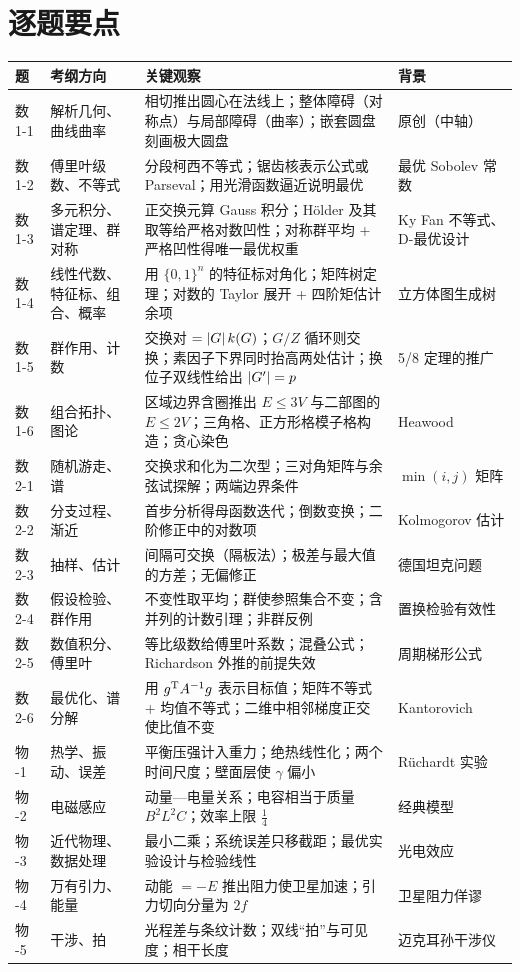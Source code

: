 \documentclass[cjk=noto, nomargin]{mojing-notes}
\begin{document}
\section{逐题要点}

{\small
\begin{longtable}{p{1.5cm}p{3.2cm}p{5.9cm}p{2.5cm}}
\toprule
题 & 考纲方向 & 关键观察 & 背景 \\
\midrule
\endhead
数 1-1 & 解析几何、曲线曲率 & 相切推出圆心在法线上；整体障碍（对称点）与局部障碍（曲率）；嵌套圆盘刻画极大圆盘 & 原创（中轴） \\
数 1-2 & 傅里叶级数、不等式 & 分段柯西不等式；锯齿核表示公式或 Parseval；用光滑函数逼近说明最优 & 最优 Sobolev 常数 \\
数 1-3 & 多元积分、谱定理、群对称 & 正交换元算 Gauss 积分；Hölder 及其取等给严格对数凹性；对称群平均 + 严格凹性得唯一最优权重 & Ky Fan 不等式、D-最优设计 \\
数 1-4 & 线性代数、特征标、组合、概率 & 用 $\{0,1\}^n$ 的特征标对角化；矩阵树定理；对数的 Taylor 展开 + 四阶矩估计余项 & 立方体图生成树 \\
数 1-5 & 群作用、计数 & 交换对 $=\lvert G\rvert\,k(G)$；$G/Z$ 循环则交换；素因子下界同时抬高两处估计；换位子双线性给出 $\lvert G'\rvert=p$ & 5/8 定理的推广 \\
数 1-6 & 组合拓扑、图论 & 区域边界含圈推出 $E\le3V$ 与二部图的 $E\le2V$；三角格、正方形格模子格构造；贪心染色 & Heawood \\
数 2-1 & 随机游走、谱 & 交换求和化为二次型；三对角矩阵与余弦试探解；两端边界条件 & $\min(i,j)$ 矩阵 \\
数 2-2 & 分支过程、渐近 & 首步分析得母函数迭代；倒数变换；二阶修正中的对数项 & Kolmogorov 估计 \\
数 2-3 & 抽样、估计 & 间隔可交换（隔板法）；极差与最大值的方差；无偏修正 & 德国坦克问题 \\
数 2-4 & 假设检验、群作用 & 不变性取平均；群使参照集合不变；含并列的计数引理；非群反例 & 置换检验有效性 \\
数 2-5 & 数值积分、傅里叶 & 等比级数给傅里叶系数；混叠公式；Richardson 外推的前提失效 & 周期梯形公式 \\
数 2-6 & 最优化、谱分解 & 用 $g^{\mathrm{T}} A^{-1}g$ 表示目标值；矩阵不等式 + 均值不等式；二维中相邻梯度正交使比值不变 & Kantorovich \\
物 -1 & 热学、振动、误差 & 平衡压强计入重力；绝热线性化；两个时间尺度；壁面层使 $\gamma$ 偏小 & Rüchardt 实验 \\
物 -2 & 电磁感应 & 动量—电量关系；电容相当于质量 $B^2L^2C$；效率上限 $\frac14$ & 经典模型 \\
物 -3 & 近代物理、数据处理 & 最小二乘；系统误差只移截距；最优实验设计与检验线性 & 光电效应 \\
物 -4 & 万有引力、能量 & 动能 $=-E$ 推出阻力使卫星加速；引力切向分量为 $2f$ & 卫星阻力佯谬 \\
物 -5 & 干涉、拍 & 光程差与条纹计数；双线“拍”与可见度；相干长度 & 迈克耳孙干涉仪 \\
\bottomrule
\end{longtable}
}
\end{document}
